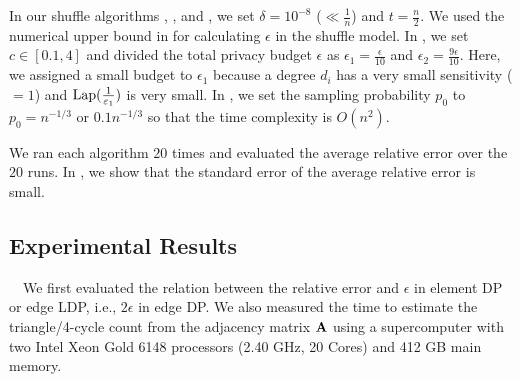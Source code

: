 In our shuffle algorithms \AlgWSTriVR{}, \AlgWSTri{}, and \AlgWSCyc{}, we set $\delta = 10^{-8}$ ($\ll \frac{1}{n}$) and $t=\frac{n}{2}$. 
We used the numerical upper bound in \cite{Feldman_FOCS21} for calculating $\epsilon$ in the shuffle model. 
In \AlgWSTriVR{}, we set 
$c\in[0.1,4]$ 
and 
divided the total privacy budget $\epsilon$ as $\epsilon_1 = \frac{\epsilon}{10}$ and $\epsilon_2 = \frac{9\epsilon}{10}$. 
Here, we assigned a small budget to $\epsilon_1$ because a degree $d_i$ has a very small sensitivity ($=1$) and $\textrm{Lap}(\frac{1}{\varepsilon_1})$ is very small. 
In \AlgARRTri{}, we set the sampling probability $p_0$ to $p_0 = n^{-1/3}$ or $0.1n^{-1/3}$ so that the time complexity is $O(n^2)$. 

We ran each algorithm $20$ times and evaluated the average relative error over the $20$ runs. 
In , we show that the standard error of the average relative error is small. 

\subsection{Experimental Results}
\label{sub:results}

{}~~We first evaluated the relation between the relative error and 
$\epsilon$ in element DP or edge LDP, i.e., $2\epsilon$ in edge DP. 
We also measured the time to estimate the triangle/4-cycle count from the adjacency matrix $\mathbf{A}$ using a supercomputer \cite{ABCI} with two Intel Xeon Gold 6148 processors (2.40 GHz, 20 Cores) and 412 GB main memory. 

